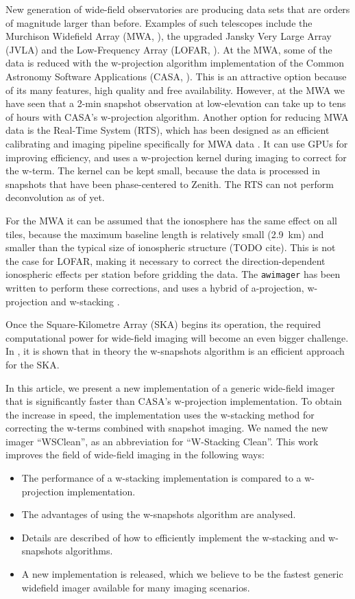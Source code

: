 \documentclass[useAMS,usenatbib]{mn2e}
\begin{document}
New generation of wide-field observatories are producing data sets that are orders of magnitude larger than before. Examples of such telescopes include the Murchison Widefield Array (MWA, \citealt{mwa}), the upgraded Jansky Very Large Array (JVLA) and the Low-Frequency Array (LOFAR, \citealt{lofar-2013}). At the MWA, some of the data is reduced with the w-projection algorithm implementation of the Common Astronomy Software Applications (CASA, \citealt{casa}). This is an attractive option because of its many features, high quality and free availability. However, at the MWA we have seen that a 2-min snapshot observation at low-elevation can take up to tens of hours with CASA's w-projection algorithm. Another option for reducing MWA data is the Real-Time System (RTS), which has been designed as an efficient calibrating and imaging pipeline specifically for MWA data \citep{rts-mwa}. It can use GPUs for improving efficiency, and uses a w-projection kernel during imaging to correct for the w-term. The kernel can be kept small, because the data is processed in snapshots that have been phase-centered to Zenith. The RTS can not perform deconvolution as of yet.

For the MWA it can be assumed that the ionosphere has the same effect on all tiles, because the maximum baseline length is relatively small (2.9~km) and smaller than the typical size of ionospheric structure (TODO cite). This is not the case for LOFAR, making it necessary to correct the direction-dependent ionospheric effects per station before gridding the data. The \texttt{awimager} has been written to perform these corrections, and uses a hybrid of a-projection, w-projection and w-stacking \citep{awimager-2013}.

Once the Square-Kilometre Array (SKA) begins its operation, the required computational power for wide-field imaging will become an even bigger challenge. In \citet{widefield-imaging-ska-cornwell}, it is shown that in theory the w-snapshots algorithm is an efficient approach for the SKA.

In this article, we present a new implementation of a generic wide-field imager that is significantly faster than CASA's w-projection implementation. To obtain the increase in speed, the implementation uses the w-stacking method for correcting the w-terms \citep{widefield-imaging-ska-cornwell} combined with snapshot imaging. We named the new imager ``WSClean'', as an abbreviation for ``W-Stacking Clean''. This work improves the field of wide-field imaging in the following ways:
\begin{itemize}
 \item The performance of a w-stacking implementation is compared to a w-projection implementation.
 \item The advantages of using the w-snapshots algorithm are analysed.
 \item Details are described of how to efficiently implement the w-stacking and w-snapshots algorithms.
 \item A new implementation is released, which we believe to be the fastest generic widefield imager available for many imaging scenarios.
\end{itemize}
\end{document}
